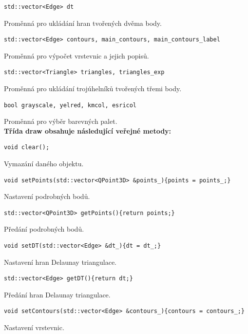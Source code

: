 \documentclass[a4paper, 12pt, oneside, titlepage]{article} %
\begin{document}
\begin{verbatim}
std::vector<Edge> dt
\end{verbatim}
Proměnná pro ukládání hran tvořených dvěma body.\\

\begin{verbatim}
std::vector<Edge> contours, main_contours, main_contours_label
\end{verbatim}
Proměnná pro výpočet vrstevnic a jejich popisů.\\

\begin{verbatim}
std::vector<Triangle> triangles, triangles_exp
\end{verbatim}
Proměnná pro ukládání trojúhelníků tvořených třemi body.\\

\begin{verbatim}
bool grayscale, yelred, kmcol, esricol
\end{verbatim}
Proměnná pro výběr barevných palet.\\

\textbf{Třída draw obsahuje následující veřejné metody:}
\begin{verbatim}
void clear();
\end{verbatim}
Vymazání daného objektu.\\

\begin{verbatim}
void setPoints(std::vector<QPoint3D> &points_){points = points_;}
\end{verbatim}
Nastavení podrobných bodů.\\

\begin{verbatim}
std::vector<QPoint3D> getPoints(){return points;}
\end{verbatim}
Předání podrobných bodů.\\

\begin{verbatim}
void setDT(std::vector<Edge> &dt_){dt = dt_;}
\end{verbatim}
Nastavení hran Delaunay triangulace.\\

\begin{verbatim}
std::vector<Edge> getDT(){return dt;}
\end{verbatim}
Předání hran Delaunay triangulace.\\

\begin{verbatim}
void setContours(std::vector<Edge> &contours_){contours = contours_;}
\end{verbatim}
Nastavení vrstevnic.\\
\end{document}
